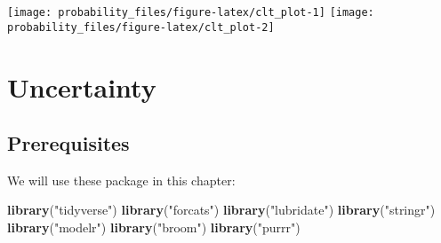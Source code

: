 \documentclass[]{book}
\newenvironment{Shaded}{\begin{snugshade}}{\end{snugshade}}
\newcommand{\ControlFlowTok}[1]{\textcolor[rgb]{0.13,0.29,0.53}{\textbf{#1}}}
\newcommand{\DataTypeTok}[1]{\textcolor[rgb]{0.13,0.29,0.53}{#1}}
\newcommand{\DecValTok}[1]{\textcolor[rgb]{0.00,0.00,0.81}{#1}}
\newcommand{\KeywordTok}[1]{\textcolor[rgb]{0.13,0.29,0.53}{\textbf{#1}}}
\newcommand{\NormalTok}[1]{#1}
\newcommand{\OperatorTok}[1]{\textcolor[rgb]{0.81,0.36,0.00}{\textbf{#1}}}
\newcommand{\StringTok}[1]{\textcolor[rgb]{0.31,0.60,0.02}{#1}}
\theoremstyle{definition}
\theoremstyle{definition}
\theoremstyle{definition}
\theoremstyle{remark}
\begin{document}
\begin{Shaded}
\end{Shaded}

\begin{center}\texttt{[image: probability\_files/figure-latex/clt\_plot-1]} \texttt{[image: probability\_files/figure-latex/clt\_plot-2]} \end{center}

\hypertarget{uncertainty}{%
\chapter{Uncertainty}\label{uncertainty}}

\hypertarget{prerequisites-8}{%
\section*{Prerequisites}\label{prerequisites-8}}

We will use these package in this chapter:

\begin{Shaded}
\begin{Highlighting}[]
\KeywordTok{library}\NormalTok{(}\StringTok{"tidyverse"}\NormalTok{)}
\KeywordTok{library}\NormalTok{(}\StringTok{"forcats"}\NormalTok{)}
\KeywordTok{library}\NormalTok{(}\StringTok{"lubridate"}\NormalTok{)}
\KeywordTok{library}\NormalTok{(}\StringTok{"stringr"}\NormalTok{)}
\KeywordTok{library}\NormalTok{(}\StringTok{"modelr"}\NormalTok{)}
\KeywordTok{library}\NormalTok{(}\StringTok{"broom"}\NormalTok{)}
\KeywordTok{library}\NormalTok{(}\StringTok{"purrr"}\NormalTok{)}
\end{Highlighting}
\end{Shaded}
\end{document}
